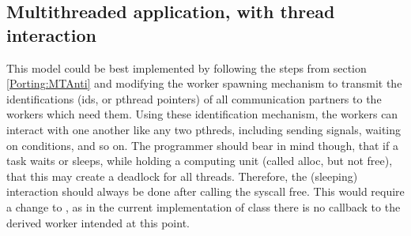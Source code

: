 \subsection{Multithreaded application, with thread interaction}
This model could be best implemented by following the steps from section \ref{Porting:MTAnti} and modifying the worker spawning mechanism to transmit the identifications (ids, or pthread pointers) of all communication partners to the workers which need them. Using these identification mechanism, the workers can interact with one another like any two pthreds, including sending signals, waiting on conditions, and so on. The programmer should bear in mind though, that if a task waits or sleeps, while holding a computing unit (called alloc, but not free), that this may create a deadlock for all threads. Therefore, the (sleeping) interaction should always be done after calling the syscall free. This would require a change to , as in the current implementation of class  there is no callback to the derived worker intended at this point.

